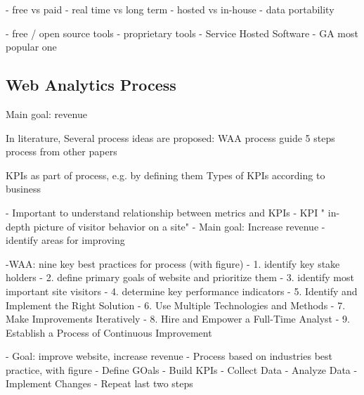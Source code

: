 

- free vs paid
- real time vs long term
- hosted vs in-house
- data portability









- free / open source tools
- proprietary tools
- Service Hosted Software
- GA most popular one












\subsection{Web Analytics Process}


Main goal: revenue

In literature, Several process ideas are proposed:
WAA process guide
5 steps process from other papers


KPIs as part of process, e.g. by defining them
Types of KPIs according to business


- Important to understand relationship between metrics and KPIs
- KPI " in-depth picture of visitor behavior on a site"
- Main goal: Increase revenue
- identify areas for improving

-WAA: nine key best practices for process (with figure)
- 1. identify key stake holders
- 2. define primary goals of website and prioritize them
- 3. identify most important site visitors
- 4. determine key performance indicators
- 5. Identify and Implement the Right Solution
- 6. Use Multiple Technologies and Methods
- 7. Make Improvements Iteratively
- 8. Hire and Empower a Full-Time Analyst
- 9. Establish a Process of Continuous Improvement



- Goal: improve website, increase revenue
- Process based on industries best practice, with figure
- Define GOals
- Build KPIs
- Collect Data
- Analyze Data
- Implement Changes
- Repeat last two steps




